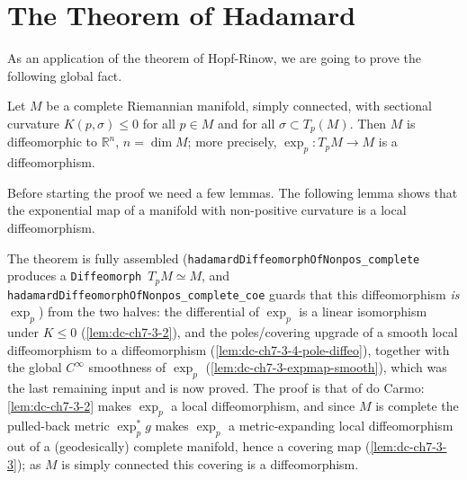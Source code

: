 \section{The Theorem of Hadamard}

As an application of the theorem of Hopf-Rinow, we are going to prove the
following global fact.

\begin{theorem}[Hadamard]
  \label{thm:dc-ch7-3-1}
  \leanok
  Let $M$ be a complete Riemannian manifold, simply connected, with sectional
  curvature $K(p,\sigma)\le 0$ for all $p\in M$ and for all $\sigma\subset T_p(M)$.
  Then $M$ is diffeomorphic to $\mathbb{R}^n$, $n=\dim M$; more precisely,
  $\exp_p:T_pM\to M$ is a diffeomorphism.

  Before starting the proof we need a few lemmas. The following lemma shows that the
  exponential map of a manifold with non-positive curvature is a local
  diffeomorphism.

  The theorem is fully assembled (\lstinline{hadamardDiffeomorphOfNonpos_complete} produces a
  \lstinline{Diffeomorph}~$T_pM\simeq M$, and \lstinline{hadamardDiffeomorphOfNonpos_complete_coe}
  guards that this diffeomorphism \emph{is} $\exp_p$) from the two halves: the differential of
  $\exp_p$ is a linear isomorphism under $K\le 0$ (\cref{lem:dc-ch7-3-2}), and the
  poles/covering upgrade of a smooth local diffeomorphism to a diffeomorphism
  (\cref{lem:dc-ch7-3-4-pole-diffeo}), together with the global $C^\infty$ smoothness of
  $\exp_p$ (\cref{lem:dc-ch7-3-expmap-smooth}), which was the last remaining input and is now
  proved. The proof is that of do Carmo: \cref{lem:dc-ch7-3-2} makes $\exp_p$ a local
  diffeomorphism, and since $M$ is complete the pulled-back metric $\exp_p^{*}g$ makes
  $\exp_p$ a metric-expanding local diffeomorphism out of a (geodesically) complete manifold,
  hence a covering map (\cref{lem:dc-ch7-3-3}); as $M$ is simply connected this covering is a
  diffeomorphism.
\end{theorem}

